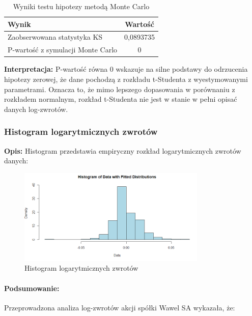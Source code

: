 \documentclass[a4paper,11pt]{article}
\begin{document}
\begin{table}[H]
    \centering
    \begin{tabular}{|p{7cm}|c|}
        \hline
        \textbf{Wynik} & \textbf{Wartość} \\
        \hline
        Zaobserwowana statystyka KS & 0,0893735 \\
        P-wartość z symulacji Monte Carlo & 0 \\
        \hline
    \end{tabular}
    \caption{Wyniki testu hipotezy metodą Monte Carlo}
    \label{tab:test_results}
\end{table}


\textbf{Interpretacja:} P-wartość równa 0 wskazuje na silne podstawy do odrzucenia hipotezy zerowej, że dane pochodzą z rozkładu t-Studenta z wyestymowanymi parametrami. Oznacza to, że mimo lepszego dopasowania w porównaniu z rozkładem normalnym, rozkład t-Studenta nie jest w stanie w pełni opisać danych log-zwrotów.

\subsubsection*{Histogram logarytmicznych zwrotów}

\textbf{Opis:} Histogram przedstawia empiryczny rozkład logarytmicznych zwrotów danych:

\begin{figure}[H]
    \centering
    \includegraphics[width=0.8\textwidth]{./Wojtek/histogram_log_returns.png}
    \caption{Histogram logarytmicznych zwrotów}
    \label{fig:histogram_log_returns}
\end{figure}

\newpage\paragraph{Podsumowanie:}

Przeprowadzona analiza log-zwrotów akcji spółki Wawel SA wykazała, że:
\end{document}
